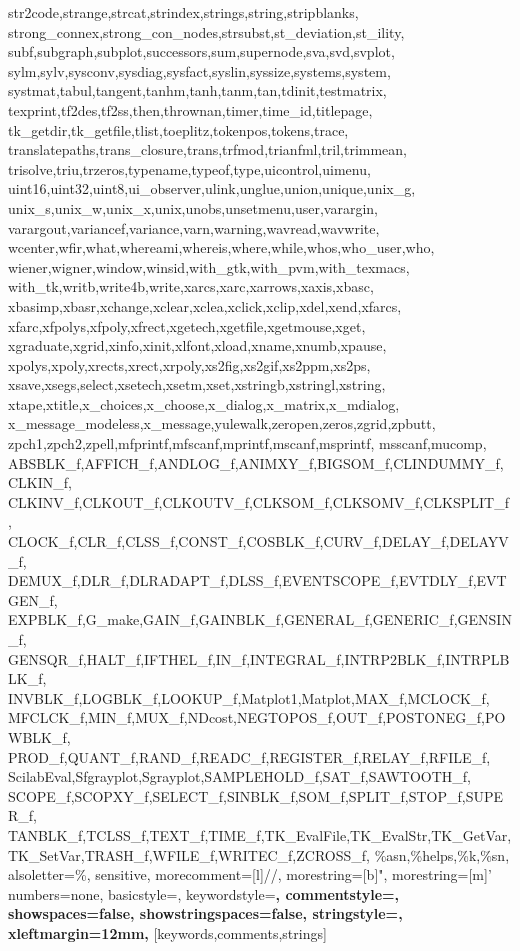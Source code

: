 {{      str2code,strange,strcat,strindex,strings,string,stripblanks,%
      strong_connex,strong_con_nodes,strsubst,st_deviation,st_ility,%
      subf,subgraph,subplot,successors,sum,supernode,sva,svd,svplot,%
      sylm,sylv,sysconv,sysdiag,sysfact,syslin,syssize,systems,system,%
      systmat,tabul,tangent,tanhm,tanh,tanm,tan,tdinit,testmatrix,%
      texprint,tf2des,tf2ss,then,thrownan,timer,time_id,titlepage,%
      tk_getdir,tk_getfile,tlist,toeplitz,tokenpos,tokens,trace,%
      translatepaths,trans_closure,trans,trfmod,trianfml,tril,trimmean,%
      trisolve,triu,trzeros,typename,typeof,type,uicontrol,uimenu,%
      uint16,uint32,uint8,ui_observer,ulink,unglue,union,unique,unix_g,%
      unix_s,unix_w,unix_x,unix,unobs,unsetmenu,user,varargin,%
      varargout,variancef,variance,varn,warning,wavread,wavwrite,%
      wcenter,wfir,what,whereami,whereis,where,while,whos,who_user,who,%
      wiener,wigner,window,winsid,with_gtk,with_pvm,with_texmacs,%
      with_tk,writb,write4b,write,xarcs,xarc,xarrows,xaxis,xbasc,%
      xbasimp,xbasr,xchange,xclear,xclea,xclick,xclip,xdel,xend,xfarcs,%
      xfarc,xfpolys,xfpoly,xfrect,xgetech,xgetfile,xgetmouse,xget,%
      xgraduate,xgrid,xinfo,xinit,xlfont,xload,xname,xnumb,xpause,%
      xpolys,xpoly,xrects,xrect,xrpoly,xs2fig,xs2gif,xs2ppm,xs2ps,%
      xsave,xsegs,select,xsetech,xsetm,xset,xstringb,xstringl,xstring,%
      xtape,xtitle,x_choices,x_choose,x_dialog,x_matrix,x_mdialog,%
      x_message_modeless,x_message,yulewalk,zeropen,zeros,zgrid,zpbutt,%
      zpch1,zpch2,zpell,mfprintf,mfscanf,mprintf,mscanf,msprintf,%
      msscanf,mucomp,%
      ABSBLK_f,AFFICH_f,ANDLOG_f,ANIMXY_f,BIGSOM_f,CLINDUMMY_f,CLKIN_f,%
      CLKINV_f,CLKOUT_f,CLKOUTV_f,CLKSOM_f,CLKSOMV_f,CLKSPLIT_f,%
      CLOCK_f,CLR_f,CLSS_f,CONST_f,COSBLK_f,CURV_f,DELAY_f,DELAYV_f,%
      DEMUX_f,DLR_f,DLRADAPT_f,DLSS_f,EVENTSCOPE_f,EVTDLY_f,EVTGEN_f,%
      EXPBLK_f,G_make,GAIN_f,GAINBLK_f,GENERAL_f,GENERIC_f,GENSIN_f,%
      GENSQR_f,HALT_f,IFTHEL_f,IN_f,INTEGRAL_f,INTRP2BLK_f,INTRPLBLK_f,%
      INVBLK_f,LOGBLK_f,LOOKUP_f,Matplot1,Matplot,MAX_f,MCLOCK_f,%
      MFCLCK_f,MIN_f,MUX_f,NDcost,NEGTOPOS_f,OUT_f,POSTONEG_f,POWBLK_f,%
      PROD_f,QUANT_f,RAND_f,READC_f,REGISTER_f,RELAY_f,RFILE_f,%
      ScilabEval,Sfgrayplot,Sgrayplot,SAMPLEHOLD_f,SAT_f,SAWTOOTH_f,%
      SCOPE_f,SCOPXY_f,SELECT_f,SINBLK_f,SOM_f,SPLIT_f,STOP_f,SUPER_f,%
      TANBLK_f,TCLSS_f,TEXT_f,TIME_f,TK_EvalFile,TK_EvalStr,TK_GetVar,%
      TK_SetVar,TRASH_f,WFILE_f,WRITEC_f,ZCROSS_f,%
      \%asn,\%helps,\%k,\%sn},%
   alsoletter=\%,%
   sensitive,%
   morecomment=[l]//,%
   morestring=[b]",%
   morestring=[m]'%
   numbers=none,%
   basicstyle=\footnotesize\ttfamily,%
   keywordstyle=\bfseries,%
   commentstyle=\bfseries,%
   showspaces=false,%
   showstringspaces=false,%
   stringstyle=\bfseries, 
   xleftmargin=12mm,
  }[keywords,comments,strings]%

